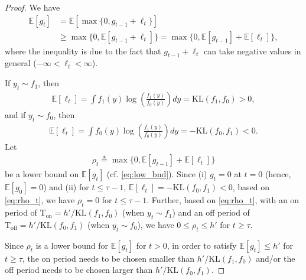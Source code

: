\documentclass[onecolumn]{IEEEtran}
\begin{document}
\begin{proof}

We have
\begin{align}\nonumber
 \mathbb{E}[g_t] &= \mathbb{E}[\max\{0, g_{t-1} + \ell_t\}] \\ \label{eq:low_bnd}
  &\geq  \max\{0, \mathbb{E}[g_{t-1} + \ell_t]\} = \max\{0, \mathbb{E}[g_{t-1}] + \mathbb{E}[\ell_t]\},
\end{align}
where the inequality is due to the fact that $g_{t-1} + \ell_t$ can take negative values in general ($-\infty < \ell_t < \infty$).

If $y_t \sim f_1$, then
\begin{gather} \nonumber
\mathbb{E}[\ell_t] = \int{f_1(y) \log(\frac{f_1(y)}{f_0(y)}) dy} = \mathrm{KL}(f_1,f_0) > 0,
\end{gather}
and if $y_t \sim f_0$, then
\begin{gather} \nonumber
\mathbb{E}[\ell_t] = \int{f_0(y) \log(\frac{f_1(y)}{f_0(y)}) dy} = -\mathrm{KL}(f_0,f_1) < 0.
\end{gather}
Let
\begin{align} \label{eq:rho_t}
\rho_t \triangleq \max\{0, \mathbb{E}[g_{t-1}] + \mathbb{E}[\ell_t]\}
\end{align}
be a lower bound on $\mathbb{E}[g_t]$ (cf. \eqref{eq:low_bnd}). Since (i) $g_t = 0$ at $t = 0$ (hence, $\mathbb{E}[g_0] = 0$) and (ii) for $t \leq \tau-1$, $\mathbb{E}[\ell_t] = -\mathrm{KL}(f_0,f_1) < 0$, based on \eqref{eq:rho_t}, we have $\rho_t = 0$ for $t \leq \tau-1$. Further, based on \eqref{eq:rho_t}, with an on period of $\mathrm{T}_{\text{on}} = {h'}/{\mathrm{KL}(f_1,f_0)}$ (when $y_t \sim f_1$) and an off period of $\mathrm{T}_{\text{off}} = {h'}/{\mathrm{KL}(f_0,f_1)}$ (when $y_t \sim f_0$), we have  $0 \leq \rho_t \leq h'$ for $t \geq \tau$.

Since $\rho_t$ is a lower bound for $\mathbb{E}[g_t]$ for $t > 0$, in order to satisfy $\mathbb{E}[g_t] \leq h'$ for $t \geq \tau$, the on period needs to be chosen smaller than ${h'}/{\mathrm{KL}(f_1,f_0)}$ and/or the off period needs to be chosen larger than ${h'}/{\mathrm{KL}(f_0,f_1)}$.


\end{proof}
\end{document}
